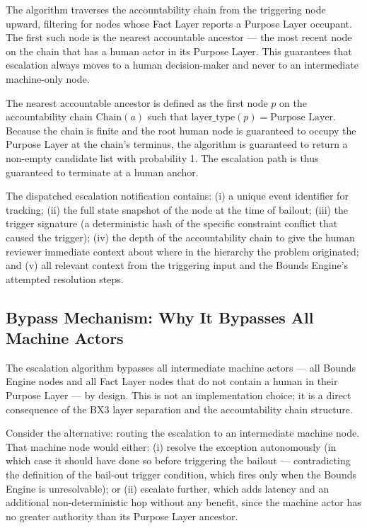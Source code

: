 The algorithm traverses the accountability chain from the triggering node upward, filtering for nodes whose Fact Layer reports a Purpose Layer occupant. The first such node is the nearest accountable ancestor — the most recent node on the chain that has a human actor in its Purpose Layer. This guarantees that escalation always moves to a human decision-maker and never to an intermediate machine-only node.

\begin{note}
The nearest accountable ancestor is defined as the first node $p$ on the accountability chain $\text{Chain}(a)$ such that $\text{layer\_type}(p) = \text{Purpose Layer}$. Because the chain is finite and the root human node is guaranteed to occupy the Purpose Layer at the chain's terminus, the algorithm is guaranteed to return a non-empty candidate list with probability 1. The escalation path is thus guaranteed to terminate at a human anchor.
\end{note}

The dispatched escalation notification contains: (i) a unique event identifier for tracking; (ii) the full state snapshot of the node at the time of bailout; (iii) the trigger signature (a deterministic hash of the specific constraint conflict that caused the trigger); (iv) the depth of the accountability chain to give the human reviewer immediate context about where in the hierarchy the problem originated; and (v) all relevant context from the triggering input and the Bounds Engine's attempted resolution steps.

\subsection{Bypass Mechanism: Why It Bypasses All Machine Actors}
\label{sec:bypass}

The escalation algorithm bypasses all intermediate machine actors — all Bounds Engine nodes and all Fact Layer nodes that do not contain a human in their Purpose Layer — by design. This is not an implementation choice; it is a direct consequence of the BX3 layer separation and the accountability chain structure.

Consider the alternative: routing the escalation to an intermediate machine node. That machine node would either: (i) resolve the exception autonomously (in which case it should have done so before triggering the bailout — contradicting the definition of the bail-out trigger condition, which fires only when the Bounds Engine is unresolvable); or (ii) escalate further, which adds latency and an additional non-deterministic hop without any benefit, since the machine actor has no greater authority than its Purpose Layer ancestor.

